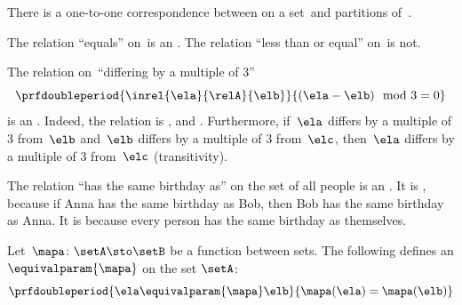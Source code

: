 \begin{lemma}
    There is a one-to-one correspondence between  on a set~\setA and partitions of~\setA.
\end{lemma}

\begin{example}
    The relation ``equals'' on~\natnumbers is an .
    The relation ``less than or equal'' on~\natnumbers is not.
\end{example}

\begin{example}
    The relation on~\natnumbers ``differing by a multiple of 3''
    \begin{equation}
        \prfdoubleperiod{
            \inrel{\ela}{\relA}{\elb}
        }{
            (\ela-\elb) \mod 3 = 0
        }
    \end{equation}
    is an .
    Indeed, the relation is , and .
    Furthermore, if~$\ela$ differs by a multiple of 3 from~$\elb$ and~$\elb$ differs by a multiple of 3 from~$\elc$, then~$\ela$ differs by a multiple of 3 from~$\elc$ (transitivity).
\end{example}

\begin{example}
    The relation ``has the same birthday as'' on the set of all people is an .
    It is , because if Anna has the same birthday as Bob, then Bob has the same birthday as Anna.
    It is  because every person has the same birthday as themselves.
\end{example}

\begin{example}
    Let~$\mapa\colon \setA \sto \setB$ be a function between sets.
    The following defines an  $\equivalparam{\mapa}$ on the set $\setA$:
    \begin{equation}
        \prfdoubleperiod{
            \ela\equivalparam{\mapa} \elb
        }{
            \mapa(\ela)=\mapa(\elb)
        }
    \end{equation}
\end{example}



\begin{marginfigure}
    \centering
    \caption{}
    \label{fig:info_network}
\end{marginfigure}

